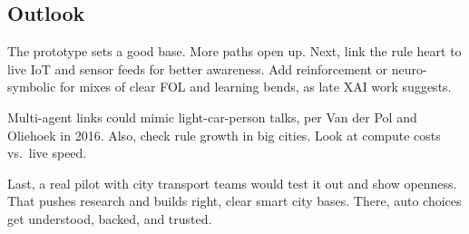 \documentclass{article}
\begin{document}
\subsection{Outlook}

The prototype sets a good base. More paths open up. Next, link the rule heart to live IoT and sensor feeds for better awareness. Add reinforcement or neuro-symbolic for mixes of clear FOL and learning bends, as late XAI work suggests.

Multi-agent links could mimic light-car-person talks, per Van der Pol and Oliehoek in 2016. Also, check rule growth in big cities. Look at compute costs vs.\ live speed.

Last, a real pilot with city transport teams would test it out and show openness. That pushes research and builds right, clear smart city bases. There, auto choices get understood, backed, and trusted.



\end{document}
